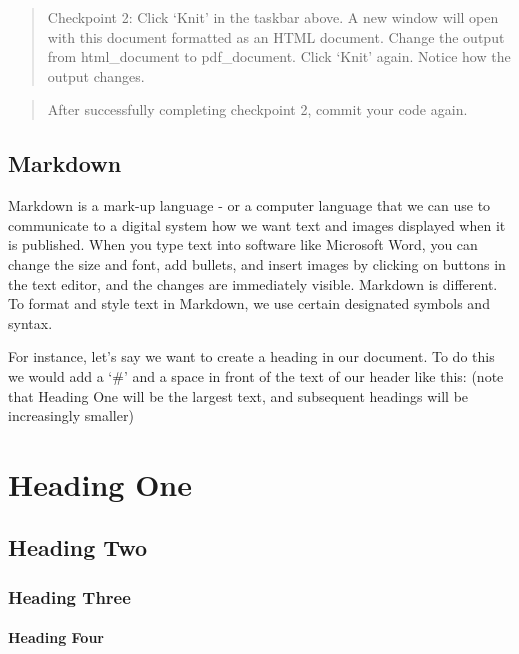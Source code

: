 \documentclass[
]{article}
\begin{document}
\begin{quote}
Checkpoint 2: Click `Knit' in the taskbar above. A new window will open
with this document formatted as an HTML document. Change the output from
html\_document to pdf\_document. Click `Knit' again. Notice how the
output changes.
\end{quote}

\begin{quote}
After successfully completing checkpoint 2, commit your code again.
\end{quote}

\hypertarget{markdown}{%
\subsection{Markdown}\label{markdown}}

Markdown is a mark-up language - or a computer language that we can use
to communicate to a digital system how we want text and images displayed
when it is published. When you type text into software like Microsoft
Word, you can change the size and font, add bullets, and insert images
by clicking on buttons in the text editor, and the changes are
immediately visible. Markdown is different. To format and style text in
Markdown, we use certain designated symbols and syntax.

For instance, let's say we want to create a heading in our document. To
do this we would add a `\#' and a space in front of the text of our
header like this: (note that Heading One will be the largest text, and
subsequent headings will be increasingly smaller)

\hypertarget{heading-one}{%
\section{Heading One}\label{heading-one}}

\hypertarget{heading-two}{%
\subsection{Heading Two}\label{heading-two}}

\hypertarget{heading-three}{%
\subsubsection{Heading Three}\label{heading-three}}

\hypertarget{heading-four}{%
\paragraph{Heading Four}\label{heading-four}}
\end{document}
